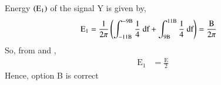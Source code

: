 \documentclass[beamer]{IEEEtran}
\theoremstyle{remark}
\begin{document}
Energy $\left(\text{E}_1\right)$ of the signal Y is given by,
\begin{align}
\label{2}
    \text{E}_1&=\frac{1}{2\pi}\brak{\int_{-11\text{B}}^{-9\text{B}}\frac{1}{4}\ \text{df}+\int_{9\text{B}}^{11\text{B}}\frac{1}{4}\ \text{df}}=\frac{\text{B}}{2\pi}
\end{align}
So, from \brak{\ref{1}} and \brak{\ref{2}},
\begin{align}
    \text{E}_1&=\frac{\text{E}}{2}
\end{align}
Hence, option B is correct
\end{document}
